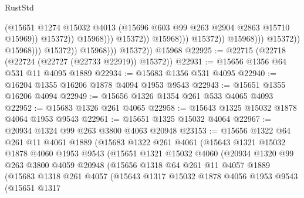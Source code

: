 \begin{lexlean}{RustStd}
\begin{coremodule}
                                                          (@15651
                                                            @1274
                                                            @15032
                                                            @4013
                                                            (@15696
                                                              @603
                                                              @99
                                                              @263
                                                              @2904
                                                              @2863
                                                              @15710
                                                              @15969))
                                                          @15372))
                                                      @15968)))
                                                @15372))
                                            @15968)))
                                      @15372))
                                  @15968)))
                            @15372))
                        @15968)))
                  @15372))
              @15968)))
        @15372))
    @15968
@22925 := @22715 (@22718 (@22724 (@22727 (@22733 @22919)) @15372))
@22931 := @15656 @1356 @64 @531 @11 @4095 @1889
@22934 := @15683 @1356 @531 @4095
@22940 := @16204 @1355 @16206 @1878 @4094 @1953 @9543
@22943 := @15651 @1355 @16206 @4094
@22949 := @15656 @1326 @1354 @261 @533 @4065 @4093
@22952 := @15683 @1326 @261 @4065
@22958 := @15643 @1325 @15032 @1878 @4064 @1953 @9543
@22961 := @15651 @1325 @15032 @4064
@22967 := @20934 @1324 @99 @263 @3800 @4063 @20948
@23153 := @15656
    @1322
    @64
    @261
    @11
    @4061
    @1889
    (@15683
      @1322
      @261
      @4061
      (@15643
        @1321
        @15032
        @1878
        @4060
        @1953
        @9543
        (@15651
          @1321
          @15032
          @4060
          (@20934
            @1320
            @99
            @263
            @3800
            @4059
            @20948
            (@15656
              @1318
              @64
              @261
              @11
              @4057
              @1889
              (@15683
                @1318
                @261
                @4057
                (@15643
                  @1317
                  @15032
                  @1878
                  @4056
                  @1953
                  @9543
                  (@15651
                    @1317

\end{coremodule}
\end{lexlean}
